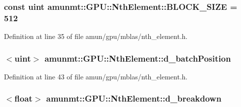 \subsubsection[{\texorpdfstring{B\+L\+O\+C\+K\+\_\+\+S\+I\+ZE}{BLOCK_SIZE}}]{\setlength{\rightskip}{0pt plus 5cm}const uint amunmt\+::\+G\+P\+U\+::\+Nth\+Element\+::\+B\+L\+O\+C\+K\+\_\+\+S\+I\+ZE = 512\hspace{0.3cm}{\ttfamily [private]}}\hypertarget{classamunmt_1_1GPU_1_1NthElement_a1f8b1479cf23b5b8aa9f703286e963c2}{}\label{classamunmt_1_1GPU_1_1NthElement_a1f8b1479cf23b5b8aa9f703286e963c2}


Definition at line 35 of file amun/gpu/mblas/nth\+\_\+element.\+h.

\subsubsection[{\texorpdfstring{d\+\_\+batch\+Position}{d_batchPosition}}]{$<$uint$>$ amunmt\+::\+G\+P\+U\+::\+Nth\+Element\+::d\+\_\+batch\+Position\hspace{0.3cm}{\ttfamily [private]}}\hypertarget{classamunmt_1_1GPU_1_1NthElement_ac2ca8b0b8656e32630331bf9b805b6bd}{}\label{classamunmt_1_1GPU_1_1NthElement_ac2ca8b0b8656e32630331bf9b805b6bd}


Definition at line 43 of file amun/gpu/mblas/nth\+\_\+element.\+h.

\subsubsection[{\texorpdfstring{d\+\_\+breakdown}{d_breakdown}}]{$<$float$>$ amunmt\+::\+G\+P\+U\+::\+Nth\+Element\+::d\+\_\+breakdown\hspace{0.3cm}{\ttfamily [private]}}\hypertarget{classamunmt_1_1GPU_1_1NthElement_a43e7096145399135e2142662f09e763a}{}\label{classamunmt_1_1GPU_1_1NthElement_a43e7096145399135e2142662f09e763a}


